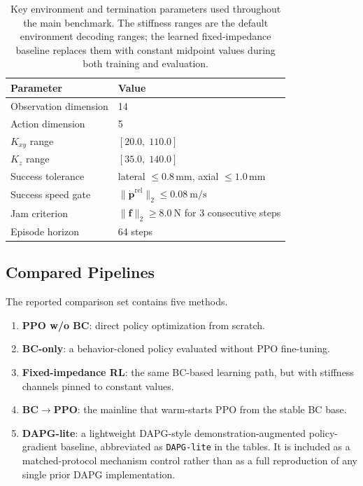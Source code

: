 ﻿\documentclass[11pt]{article}
\newcommand{\code}[1]{\nolinkurl{#1}}
\newcommand{\mm}{\ensuremath{\mathrm{mm}}}
\newcommand{\N}{\ensuremath{\mathrm{N}}}
\begin{document}
\begin{table}[t]
  \centering
  \small
  \caption{Key environment and termination parameters used throughout the main benchmark. The
  stiffness ranges are the default environment decoding ranges; the learned fixed-impedance
  baseline replaces them with constant midpoint values during both training and evaluation.}
  \label{tab:env_params}
  \begin{tabular}{ll}
    \toprule
    Parameter & Value \\
    \midrule
    Observation dimension & 14 \\
    Action dimension & 5 \\
    $K_{xy}$ range & $[20.0,\;110.0]$ \\
    $K_z$ range & $[35.0,\;140.0]$ \\
    Success tolerance & lateral $\le 0.8\,\mm$, axial $\le 1.0\,\mm$ \\
    Success speed gate & $\|\dot{\mathbf{p}}^{\mathrm{rel}}\|_2 \le 0.08~\mathrm{m/s}$ \\
    Jam criterion & $\|\mathbf{f}\|_2 \ge 8.0~\N$ for 3 consecutive steps \\
    Episode horizon & 64 steps \\
    \bottomrule
  \end{tabular}
\end{table}

\subsection{Compared Pipelines}

The reported comparison set contains five methods.
\begin{enumerate}
  \item \textbf{PPO w/o BC}: direct policy optimization from scratch.
  \item \textbf{BC-only}: a behavior-cloned policy evaluated without PPO fine-tuning.
  \item \textbf{Fixed-impedance RL}: the same BC-based learning path, but with stiffness channels
  pinned to constant values.
  \item \textbf{BC$\rightarrow$PPO}: the mainline that warm-starts PPO from the stable BC base.
  \item \textbf{DAPG-lite}: a lightweight DAPG-style demonstration-augmented policy-gradient
  baseline, abbreviated as \code{DAPG-lite} in the tables. It is included as a matched-protocol
  mechanism control rather than as a full
  reproduction of any single prior DAPG implementation.
\end{enumerate}
\end{document}
